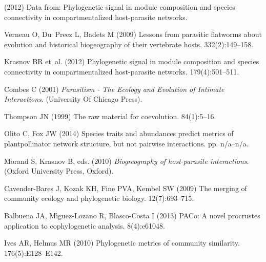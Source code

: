 \documentclass{pnastwo}
\begin{document}
\begin{article}
\begin{thebibliography}{10}
(2012) Data from: Phylogenetic signal in module composition and species
  connectivity in compartmentalized host-parasite networks.

Verneau O, Du~Preez L, Badets M (2009) Lessons from parasitic flatworms about
  evolution and historical biogeography of their vertebrate hosts.
 332(2):149--158.

Krasnov BR et~al. (2012) Phylogenetic signal in module composition and species
  connectivity in compartmentalized host-parasite networks.
 179(4):501--511.

Combes C (2001) {\em Parasitism - The Ecology and Evolution of Intimate
  Interactions}.
\newblock (University Of Chicago Press).

Thompson JN (1999) The raw material for coevolution.
 84(1):5--16.

Olito C, Fox JW (2014) Species traits and abundances predict metrics of
  plant{\textendash}pollinator network structure, but not pairwise
  interactions.
 pp. n/a--n/a.

Morand S, Krasnov B, eds. (2010) {\em Biogreography of host-parasite
  interactions}.
\newblock (Oxford University Press, Oxford).

Cavender-Bares J, Kozak KH, Fine PVA, Kembel SW (2009) The merging of community
  ecology and phylogenetic biology.
 12(7):693--715.

Balbuena JA, M{\'\i}guez-Lozano R, Blasco-Costa I (2013) {PACo}: A novel
  procrustes application to cophylogenetic analysis.
 8(4):e61048.

Ives AR, Helmus MR (2010) Phylogenetic metrics of community similarity.
 176(5):E128--E142.

\end{thebibliography}


\end{article}
\end{document}
